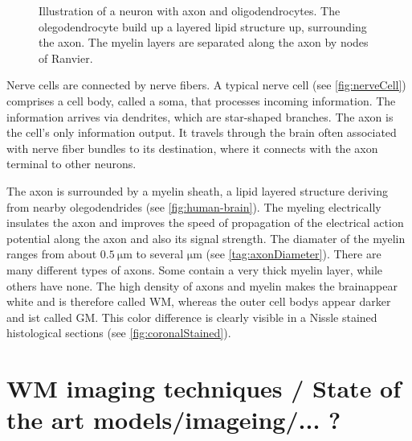 \begin{figure}[!t]
\caption{Illustration of a neuron with axon and oligodendrocytes. The olegodendrocyte build up a layered lipid structure up, surrounding the axon. The myelin layers are separated along the axon by nodes of Ranvier.}
\label{fig:CortexAndNerveCell}
\end{figure}
%
Nerve cells are connected by nerve fibers.
A typical nerve cell (see \cref{fig:nerveCell}) comprises a cell body, called a soma, that processes incoming information.
The information arrives via dendrites, which are star-shaped branches.
The axon is the cell's only information output.
It travels through the brain often associated with nerve fiber bundles to its destination, where it connects with the axon terminal to other neurons.
\par
%
The axon is surrounded by a myelin sheath, a lipid layered structure deriving from nearby olegodendrides (see \cref{fig:human-brain}).
The myeling electrically insulates the axon and improves the speed of propagation of the electrical action potential along the axon and also its signal strength.
The diamater of the myelin ranges from about $\SI{0.5}{\micro\meter}$ to several $\si{\micro\meter}$ (see \cref{tag:axonDiameter}).
There are many different types of axons.
Some contain a very thick myelin layer, while others have none.
The high density of axons and myelin makes the brainappear white and is therefore called \ac{WM}, whereas the outer cell bodys appear darker and ist called \ac{GM}.
This color difference is clearly visible in a Nissle stained histological sections (see \cref{fig:coronalStained}).
%
% 
% 
% 
\section{WM imaging techniques / State of the art models/imageing/... ?}
% 
